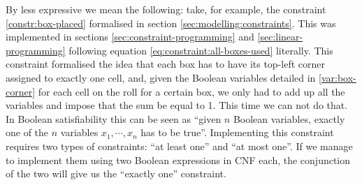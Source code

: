 By less expressive we mean the following: take, for example,
the constraint \ref{constr:box-placed} formalised in section
\ref{sec:modelling:constraints}. This was implemented in
sections \ref{sec:constraint-programming} and \ref{sec:linear-programming}
following equation \ref{eq:constraint:all-boxes-used} literally.
This constraint formalised the idea that each box has to have its
top-left corner assigned to exactly one cell, and, given the
Boolean variables detailed in \ref{var:box-corner} for each cell
on the roll for a certain box, we only had to add up all the
variables and impose that the sum be equal to 1. This time we can
not do that. In Boolean satisfiability this can be seen as ``given $n$
Boolean variables, exactly one of the $n$ variables $x_1,\cdots,x_n$ has
to be true''. Implementing this constraint requires two types
of constraints: ``at least one'' and ``at most one''. If we
manage to implement them using two Boolean expressions in CNF
each, the conjunction of the two will give us the ``exactly one''
constraint.
